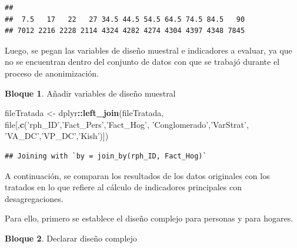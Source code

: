 \documentclass[]{book}
\newenvironment{Shaded}{\begin{snugshade}}{\end{snugshade}}
\newcommand{\KeywordTok}[1]{\textcolor[rgb]{0.13,0.29,0.53}{\textbf{#1}}}
\newcommand{\NormalTok}[1]{#1}
\newcommand{\OperatorTok}[1]{\textcolor[rgb]{0.81,0.36,0.00}{\textbf{#1}}}
\newcommand{\StringTok}[1]{\textcolor[rgb]{0.31,0.60,0.02}{#1}}
\theoremstyle{definition}
\theoremstyle{definition}
\newtheorem{example}{Bloque}[chapter]
\theoremstyle{definition}
\theoremstyle{definition}
\theoremstyle{remark}
\begin{document}
\begin{verbatim}
## 
##  7.5   17   22   27 34.5 44.5 54.5 64.5 74.5 84.5   90 
## 7012 2216 2228 2114 4324 4282 4274 4304 4397 4348 7845
\end{verbatim}

Luego, se pegan las variables de diseño muestral e indicadores a evaluar, ya que no se encuentran dentro del conjunto de datos con que se trabajó durante el proceso de anonimización.

\begin{example}
\protect\hypertarget{exm:bloque74nbm}{}{\label{exm:bloque74nbm} }Añadir variables de diseño muestral
\end{example}

\begin{Shaded}
\begin{Highlighting}[]
\NormalTok{fileTratada <-}\StringTok{ }\NormalTok{dplyr}\OperatorTok{::}\KeywordTok{left_join}\NormalTok{(fileTratada,}
\NormalTok{                                file[,}\KeywordTok{c}\NormalTok{(}\StringTok{'rph_ID'}\NormalTok{,}\StringTok{'Fact_Pers'}\NormalTok{,}\StringTok{'Fact_Hog'}\NormalTok{,}
                                        \StringTok{'Conglomerado'}\NormalTok{,}\StringTok{'VarStrat'}\NormalTok{,}
                                        \StringTok{'VA_DC'}\NormalTok{,}\StringTok{'VP_DC'}\NormalTok{,}\StringTok{'Kish'}\NormalTok{)])}
\end{Highlighting}
\end{Shaded}

\begin{verbatim}
## Joining with `by = join_by(rph_ID, Fact_Hog)`
\end{verbatim}

A continuación, se comparan los resultados de los datos originales con los tratados en lo que refiere al cálculo de indicadores principales con desagregaciones.

Para ello, primero se establece el diseño complejo para personas y para hogares.

\begin{example}
\protect\hypertarget{exm:bloque75nbm}{}{\label{exm:bloque75nbm} }Declarar diseño complejo
\end{example}
\end{document}
